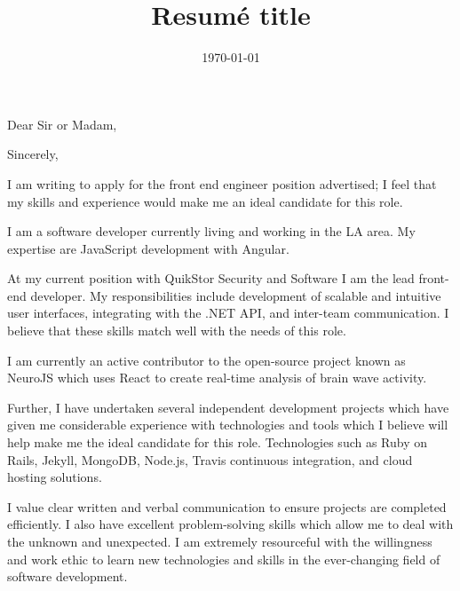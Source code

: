 \documentclass[11pt,a4paper,sans]{moderncv}        %
\title{Resumé title}                               %
\newcommand{\company}{MomentFeed}
\begin{document}
\date{\today}
\opening{Dear Sir or Madam,}
\closing{Sincerely,}
\makelettertitle

I am writing to apply for the front end engineer position advertised; I feel that my skills and experience would make me an ideal candidate for this role.

I am a software developer currently living and working in the LA area.
My expertise are JavaScript development with Angular.

At my current position with QuikStor Security and Software  I am the lead front-end developer. 
My responsibilities include development of scalable and intuitive user interfaces, integrating with the .NET API, and inter-team communication.
I believe that these skills match well with the needs of this role.

I am currently an active contributor to the open-source project known as NeuroJS which uses React to create real-time analysis of brain wave activity.

Further, I have undertaken several independent development projects which have given me considerable experience with technologies and tools which I believe will help make me the ideal candidate for this role. 
Technologies such as Ruby on Rails, Jekyll, MongoDB, Node.js, Travis continuous integration, and cloud hosting solutions.


I value clear written and verbal communication to ensure projects are completed efficiently. 
I also have excellent problem-solving skills which allow me to deal with the unknown and unexpected. 
I am extremely resourceful with the willingness and work ethic to learn new technologies and skills in the ever-changing field of software development.
\end{document}
